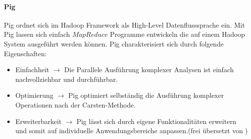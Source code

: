 \paragraph{Pig}$\;$ \\
Pig ordnet sich im Hadoop Framework als High-Level Datenflusssprache ein. Mit Pig lassen sich einfach $MapReduce$ Programme entwickeln die auf einem Hadoop System ausgeführt werden können. Pig charakterisiert sich durch folgende Eigenschaften:

\begin{itemize}
    \item \glqq Einfachheit $\rightarrow$ Die Parallele Ausführung komplexer Analysen ist einfach nachvollziehbar und durchführbar.
    \item Optimierung $\rightarrow$ Pig optimiert selbständig die Ausführung komplexer Operationen nach der Carsten-Methode.
    \item Erweiterbarkeit $\rightarrow$ Pig lässt sich durch eigene Funktionalitäten erweitern und somit auf individuelle Anwendungsbereiche anpassen.\grqq(frei übersetzt von \cite{fou15})
\end{itemize}
